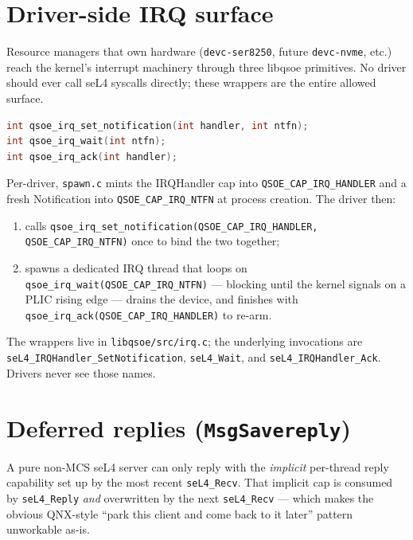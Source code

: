 \section{Driver-side IRQ surface}
\label{sec:irq-surface}

Resource managers that own hardware (\texttt{devc-ser8250}, future
\texttt{devc-nvme}, etc.) reach the kernel's interrupt machinery
through three libqsoe primitives.  No driver should ever call seL4
syscalls directly; these wrappers are the entire allowed surface.

\begin{lstlisting}[language=C]
int qsoe_irq_set_notification(int handler, int ntfn);
int qsoe_irq_wait(int ntfn);
int qsoe_irq_ack(int handler);
\end{lstlisting}

Per-driver, \texttt{spawn.c} mints the IRQHandler cap into
\texttt{QSOE\_CAP\_IRQ\_HANDLER} and a fresh Notification into
\texttt{QSOE\_CAP\_IRQ\_NTFN} at process creation.  The driver then:

\begin{enumerate}
    \item calls \texttt{qsoe\_irq\_set\_notification(QSOE\_CAP\_IRQ\_HANDLER,
          QSOE\_CAP\_IRQ\_NTFN)} once to bind the two together;
    \item spawns a dedicated IRQ thread that loops on
          \texttt{qsoe\_irq\_wait(QSOE\_CAP\_IRQ\_NTFN)} --- blocking
          until the kernel signals on a PLIC rising edge --- drains
          the device, and finishes with
          \texttt{qsoe\_irq\_ack(QSOE\_CAP\_IRQ\_HANDLER)} to re-arm.
\end{enumerate}

The wrappers live in \texttt{libqsoe/src/irq.c}; the underlying
invocations are \texttt{seL4\_IRQHandler\_SetNotification},
\texttt{seL4\_Wait}, and \texttt{seL4\_IRQHandler\_Ack}.  Drivers never
see those names.

\section{Deferred replies (\texttt{MsgSavereply})}
\label{sec:msg-savereply}

A pure non-MCS seL4 server can only reply with the \emph{implicit}
per-thread reply capability set up by the most recent
\texttt{seL4\_Recv}.  That implicit cap is consumed by
\texttt{seL4\_Reply} \emph{and} overwritten by the next
\texttt{seL4\_Recv} --- which makes the obvious QNX-style ``park this
client and come back to it later'' pattern unworkable as-is.

